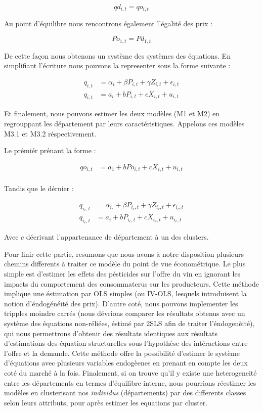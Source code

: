 \documentclass[11pt,]{article}
\begin{document}
\begin{equation*}
  qd_{i,t} = qo_{i,t}
\end{equation*}

Au point d'équilibre nous rencontrons également l'égalité des prix :

\begin{equation*}
  Po_{1,t} = Pd_{1,t}
\end{equation*}

De cette façon nous obtenons un système des systèmes des équations. En
simplifiant l'écriture nous pouvons la representer sous la forme
suivante :

\begin{align*}
  q_{i,t} & = \alpha_{i} + \beta P_{i,t} + \gamma Z_{i,t} + \epsilon_{i,t} \\
  q_{i,t} & = a_i + b P_{i,t} + c X_{i,t} + u_{i,t}
\end{align*}

Et finalement, nous pouvons estimer les deux modèles (M1 et M2) en
regrouppant les département par leurs caractéristiques. Appelons ces
modèles M3.1 et M3.2 réspectivement.

Le prémiér prénant la forme :

\begin{align*}
  qo_{i,t} & = a_1 + b Po_{i,t} + c X_{i,t} + u_{i,t} \\ 
\end{align*}

Tandis que le dérnier :

\begin{align*}
  q_{i_{c},t} & = \alpha_{i_{c}} + \beta P_{i_{c},t} + \gamma Z_{i_{c},t} + \epsilon_{i_{c},t} \\
  q_{i_{c},t} & = a_i + b P_{i_{c},t} + c X_{i_{c},t} + u_{i_{c},t}
\end{align*}

Avec \(c\) décrivant l'appartenance de département à un des clusters.

Pour finir cette partie, resumons que nous avons à notre disposition
plusieurs chemins differents à traiter ce modèle du point de vue
économétrique. Le plus simple est d'estimer les effets des pésticides
sur l'offre du vin en ignorant les impacts du comportement des
consommaterus sur les producteurs. Cette méthode implique une éstimation
par OLS simples (ou IV-OLS, lesquels introduisent la notion
d'éndogénéité des prix). D'autre coté, nous pouvons implementer les
tripples moindre carrés (nous dévrions comparer les résultats obtenus
avec un système des équations non-réliées, éstimé par 2SLS afin de
traiter l'éndogenèité), qui nous permettrons d'obtenir des résultats
identiques aux résultats d'estimations des équation structurelles sous
l'hypothèse des intéractions entre l'offre et la demande. Cette méthode
offre la possibilité d'estimer le système d'équations avec plusieurs
variables endogèenes en prenant en compte les deux coté du marché à la
fois. Finalement, si on trouve qu'il y existe une heterogeneité entre
les départements en termes d'équilibre interne, nous pourrions réestimer
les modèles en clusterisant nos \emph{individus} (départements) par des
differents classes selon leurs attributs, pour après estimer les
equations par cluster.
\end{document}

